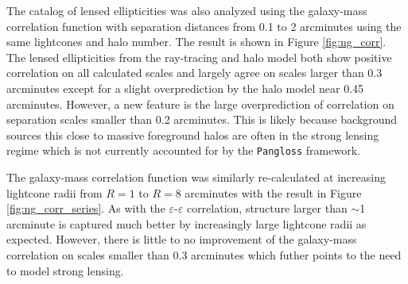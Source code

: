 \documentclass[%
 reprint,
 amsmath,amssymb,
 aps,nofootinbib
]{revtex4-1}
\begin{document}
The catalog of lensed ellipticities was also analyzed using the galaxy-mass correlation function with separation distances from 0.1 to 2 arcminutes using the same lightcones and halo number. The result is shown in Figure \ref{fig:ng_corr}. The lensed ellipticities from the ray-tracing and halo model both show positive correlation on all calculated scales and largely agree on scales larger than 0.3 arcminutes except for a slight overprediction by the halo model near 0.45 arcminutes. However, a new feature is the large overprediction of correlation on separation scales smaller than 0.2 arcminutes. This is likely because background sources this close to massive foreground halos are often in the strong lensing regime which is not currently accounted for by the \texttt{Pangloss} framework.

The galaxy-mass correlation function was similarly re-calculated at increasing lightcone radii from $R=1$ to $R=8$ arcminutes with the result in Figure \ref{fig:ng_corr_series}. As with the $\varepsilon$-$\varepsilon$ correlation, structure larger than $\sim$1 arcminute is captured much better by increasingly large lightcone radii as expected. However, there is little to no improvement of the galaxy-mass correlation on scales smaller than 0.3 arcminutes which futher points to the need to model strong lensing.
\end{document}
